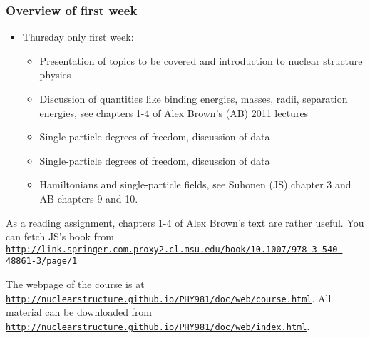 \documentclass{beamer}
\begin{document}
\begin{frame}
\frametitle{Overview of first week}

\begin{block}{}

\begin{itemize}
\item Thursday only first week:
\begin{itemize}

 \item Presentation of topics to be covered and introduction to nuclear structure physics

 \item Discussion of quantities like binding energies, masses, radii, separation energies, see chapters 1-4 of Alex Brown's (AB) 2011 lectures

 \item Single-particle degrees of freedom, discussion of data

 \item Single-particle degrees of freedom, discussion of data

 \item Hamiltonians and single-particle fields, see  Suhonen (JS) chapter 3  and AB chapters 9 and 10.
\end{itemize}

\noindent
\end{itemize}

\noindent
As a reading assignment, chapters 1-4 of Alex Brown's text are rather useful.
You can fetch JS's book from \href{{http://link.springer.com.proxy2.cl.msu.edu/book/10.1007/978-3-540-48861-3/page/1}}{\nolinkurl{http://link.springer.com.proxy2.cl.msu.edu/book/10.1007/978-3-540-48861-3/page/1}}

The webpage of the course is at \href{{http://nuclearstructure.github.io/PHY981/doc/web/course.html}}{\nolinkurl{http://nuclearstructure.github.io/PHY981/doc/web/course.html}}.
All material can be downloaded from \href{{http://nuclearstructure.github.io/PHY981/doc/web/index.html}}{\nolinkurl{http://nuclearstructure.github.io/PHY981/doc/web/index.html}}.
\end{block}
\end{frame}
\end{document}
